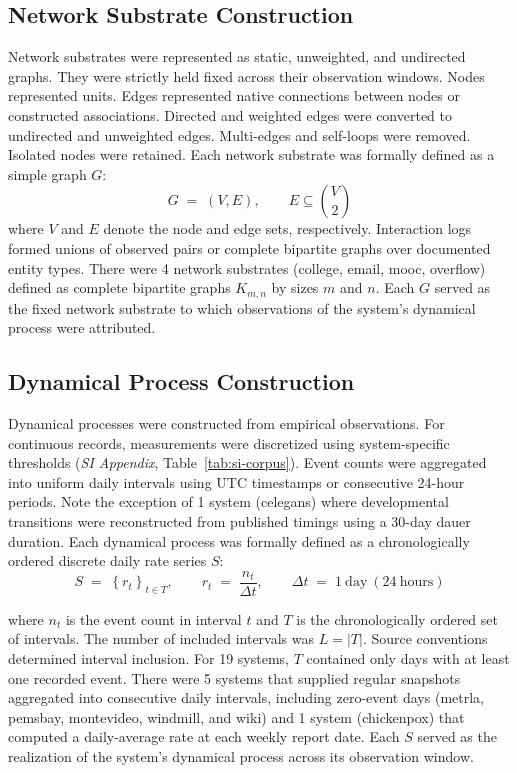 \documentclass{article}
\begin{document}
\subsection*{Network Substrate Construction}
Network substrates were represented as static, unweighted, and undirected graphs. They were strictly held fixed across their observation windows. Nodes represented units. Edges represented native connections between nodes or constructed associations. Directed and weighted edges were converted to undirected and unweighted edges. Multi-edges and self-loops were removed. Isolated nodes were retained. Each network substrate was formally defined as a simple graph $G$:
\begin{equation}
    G \;=\; (V, E),
    \qquad
    E \subseteq \binom{V}{2}
\label{eq:graph}
\end{equation}
where $V$ and $E$ denote the node and edge sets, respectively. Interaction logs formed unions of observed pairs or complete bipartite graphs over documented entity types. There were 4 network substrates (college, email, mooc, overflow) defined as complete bipartite graphs $K_{m,n}$ by sizes $m$ and $n$. Each $G$ served as the fixed network substrate to which observations of the system's dynamical process were attributed.

\subsection*{Dynamical Process Construction}
Dynamical processes were constructed from empirical observations. For continuous records, measurements were discretized using system-specific thresholds (\textit{SI Appendix}, Table~\ref{tab:si-corpus}). Event counts were aggregated into uniform daily intervals using UTC timestamps or consecutive 24-hour periods. Note the exception of 1 system (celegans) where developmental transitions were reconstructed from published timings using a 30-day dauer duration. Each dynamical process was formally defined as a chronologically ordered discrete daily rate series $S$:
\begin{equation}
    S \;=\; \left\{ r_{t} \right\}_{t \in T},
    \qquad
    r_{t} \;=\; \frac{n_{t}}{\Delta t},
    \qquad
    \Delta t \;=\; 1\ \mathrm{day}\ (24\ \mathrm{hours})
    \label{eq:series}
\end{equation}

where $n_{t}$ is the event count in interval $t$ and $T$ is the chronologically ordered set of intervals. The number of included intervals was $L = \lvert T \rvert$. Source conventions determined interval inclusion. For 19 systems, $T$ contained only days with at least one recorded event. There were 5 systems that supplied regular snapshots aggregated into consecutive daily intervals, including zero-event days (metrla, pemsbay, montevideo, windmill, and wiki) and 1 system (chickenpox) that computed a daily-average rate at each weekly report date. Each $S$ served as the realization of the system's dynamical process across its observation window.
\end{document}
